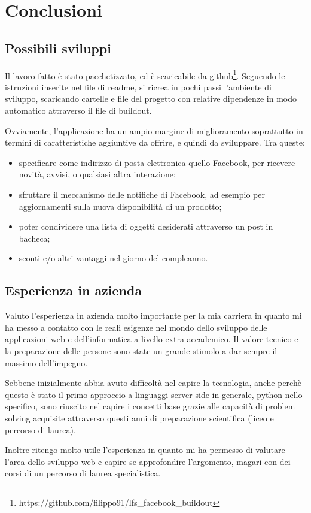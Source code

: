 \chapter{Conclusioni}
\section{Possibili sviluppi}
Il lavoro fatto è stato pacchetizzato, ed è scaricabile da github\footnote{https://github.com/filippo91/lfs\_facebook\_buildout}. Seguendo le istruzioni inserite nel file di readme, si ricrea in pochi passi l'ambiente di sviluppo, scaricando cartelle e file del progetto con relative dipendenze in modo automatico attraverso il file di buildout.

Ovviamente, l'applicazione ha un ampio margine di miglioramento soprattutto in termini di caratteristiche aggiuntive da offrire, e quindi da sviluppare.
Tra queste:
 \begin{itemize}
	\item specificare come indirizzo di posta elettronica quello Facebook, per ricevere novità, avvisi, o qualsiasi altra interazione;
	\item sfruttare il meccanismo delle notifiche di Facebook, ad esempio per aggiornamenti sulla nuova disponibilità di un prodotto;
	\item poter condividere una lista di oggetti desiderati attraverso un post in bacheca;
	\item sconti e/o altri vantaggi nel giorno del compleanno.
\end{itemize}

\section{Esperienza in azienda}
Valuto l'esperienza in azienda molto importante per la mia carriera in quanto mi ha messo a contatto con le reali esigenze nel mondo dello sviluppo delle applicazioni web e dell'informatica a livello extra-accademico. Il valore tecnico e la preparazione delle persone sono state un grande stimolo a dar sempre il massimo dell'impegno.

Sebbene inizialmente abbia avuto difficoltà nel capire la tecnologia, anche perchè questo è stato il primo approccio a linguaggi server-side in generale, python nello specifico, sono riuscito nel capire i concetti base grazie alle capacità di problem solving acquisite attraverso questi anni di preparazione scientifica (liceo e percorso di laurea). 

Inoltre ritengo molto utile l'esperienza in quanto mi ha permesso di valutare l'area dello sviluppo web e capire se approfondire l'argomento, magari con dei corsi di un percorso di laurea specialistica.
